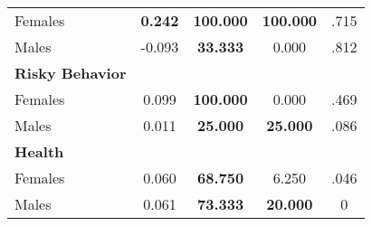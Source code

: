 \begin{tabular}{l c c c c}
\quad Females &  \textbf{    0.242} & \textbf{  100.000} & \textbf{  100.000} & .715 \\
\quad Males &     -0.093 & \textbf{   33.333} &     0.000 & .812 \\
\midrule
\textbf{Risky Behavior} & & & & \\
\quad Females &      0.099 & \textbf{  100.000} &     0.000 & .469 \\
\quad Males &      0.011 & \textbf{   25.000} & \textbf{   25.000} & .086 \\
\midrule
\textbf{Health} & & & & \\
\quad Females &      0.060 & \textbf{   68.750} &     6.250 & .046 \\
\quad Males &      0.061 & \textbf{   73.333} & \textbf{   20.000} & 0 \\
\bottomrule
\end{tabular}

